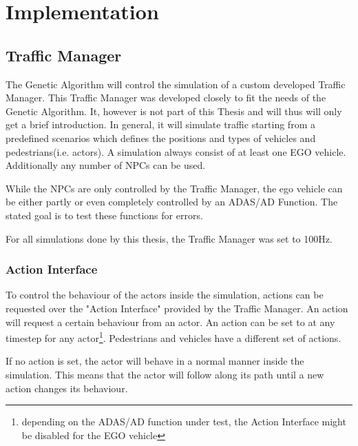 \chapter{Implementation}

\section{Traffic Manager}
The Genetic Algorithm will control the simulation of a custom developed Traffic Manager. This Traffic Manager was developed closely to fit the needs of the Genetic Algorithm. 
It, however is not part of this Thesis and will thus will only get a brief introduction. 
In general, it will simulate traffic starting from a predefined scenarios which defines the positions and types of vehicles and pedestrians(i.e. actors). 
A simulation always consist of at least one EGO vehicle. Additionally any number of NPCs can be used.

While the NPCs are only controlled by the Traffic Manager, the ego vehicle can be either partly or even completely controlled by an ADAS/AD Function. The stated goal is to test these functions for errors.

For all simulations done by this thesis, the Traffic Manager was set to 100Hz.

\subsection{Action Interface}
\label{implementation:action_interface}
To control the behaviour of the actors inside the simulation, actions can be requested over the "Action Interface" provided by the Traffic Manager. An action will request a certain behaviour from an actor. An action can be set to at any timestep for any actor\footnote{depending on the ADAS/AD function under test, the Action Interface might be disabled for the EGO vehicle}. Pedestrians and vehicles have a different set of actions.


If no action is set, the actor will behave in a normal manner inside the simulation. This means that the actor will follow along its path until a new action changes its behaviour.

